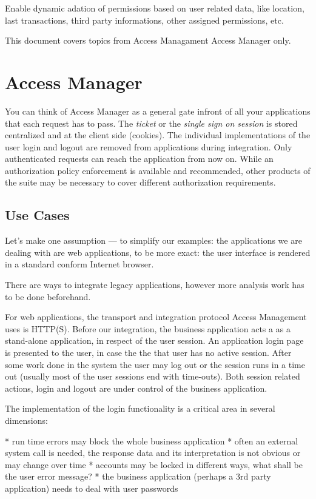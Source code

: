 Enable dynamic adation of permissions based on user related data, like location, last transactions, third party informations, other assigned permissions, etc.


This document covers topics from Access Managament Access Manager only.


\section{Access Manager}


You can think of Access Manager as a general gate infront of all your applications that each request has to pass. The \emph{ticket} or the \emph{single sign on session} is stored centralized and at the client side (cookies). The individual implementations of the user login and logout are removed from applications during integration. Only authenticated requests can reach the application from now on. While an authorization policy enforcement is available and recommended, other products of the suite may be necessary to cover different authorization requirements.


\subsection{Use Cases}

Let's make one assumption --- to simplify our examples: the applications we are dealing with are web applications, to be more exact: the user interface is rendered in a standard conform Internet browser.

There are ways to integrate legacy applications, however more analysis work has to be done beforehand. 

For web applications, the transport and integration protocol Access Management uses is HTTP{(S)}. Before our integration, the business application acts a as a stand-alone application, in respect of the user session. An application login page is presented to the user, in case the the that user has no active session. After some work done in the system the user may log out or the session runs in a time out (usually most of the user sessions end with time-outs). Both session related actions, login and logout are under control of the business application.

The implementation of the login functionality is a critical area in several dimensions:

* run time errors may block the whole business application
* often an external system call is needed, the response data and its interpretation is not obvious or may change over time
* accounts may be locked in different ways, what shall be the user error message?
* the business application (perhaps a 3rd party application) needs to deal with user passwords

